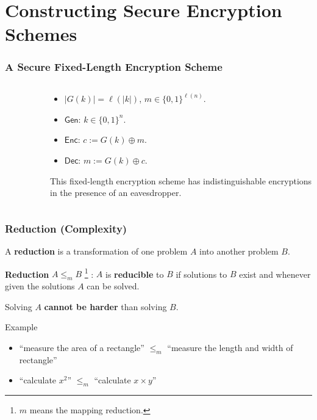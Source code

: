\section{Constructing Secure Encryption Schemes}
\begin{frame}\frametitle{A Secure Fixed-Length Encryption Scheme}
\begin{columns}[t]
\begin{column}{4cm}
\begin{figure}
\begin{center}

\end{center}
\end{figure}
\end{column}
\begin{column}{6cm}
\begin{construction}\label{con:fl}
\begin{itemize}
\item $|G(k)| = \ell(|k|)$, $m \in \{0,1\}^{\ell(n)}$.
\item $\mathsf{Gen}$: $k \in \{0,1\}^n$.
\item $\mathsf{Enc}$: $c := G(k)\oplus m$.
\item $\mathsf{Dec}$: $m := G(k)\oplus c$.
\end{itemize}
\end{construction}
\begin{theorem}\label{the:flt}
This fixed-length encryption scheme has indistinguishable encryptions in the presence of an eavesdropper.
\end{theorem}
\end{column}
\end{columns}
\end{frame}
\begin{frame}\frametitle{Reduction (Complexity)}
A \textbf{reduction} is a transformation of one problem $A$ into another problem $B$.
\newline

\textbf{Reduction} $A \le_m B$ \footnote{$m$ means the mapping reduction.} : $A$ is \textbf{reducible} to $B$ if solutions to $B$ exist and whenever given the solutions $A$ can be solved. \newline

Solving $A$ \textbf{cannot be harder} than solving $B$.
\begin{exampleblock}{Example}
\begin{itemize}
\item ``measure the area of a rectangle'' $\le_m$ ``measure the length and width of rectangle''
\item ``calculate $x^2$'' $\le_m$ ``calculate $x \times y$''
\end{itemize}
\end{exampleblock}
\end{frame}

